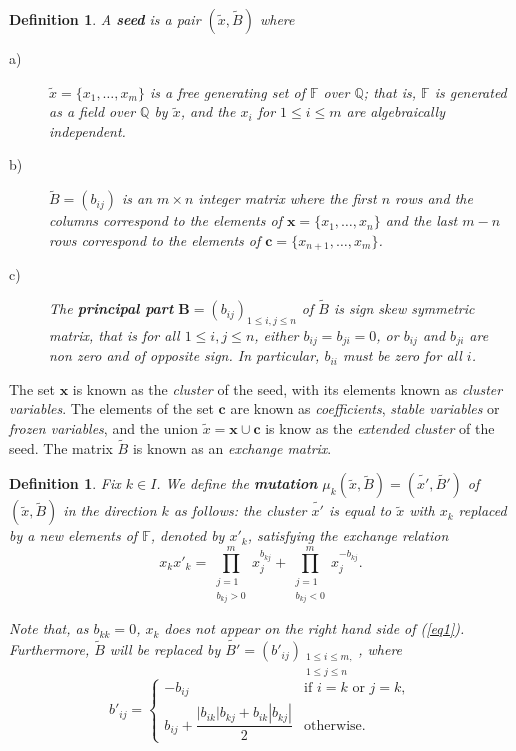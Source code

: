 \documentclass[12pt,a4paper]{article}
\newtheorem{definition}[Theorem]{Definition}
\begin{document}
\begin{definition}
A \textbf{seed} is a pair $(\tilde{x}, \tilde{B})$ where

\begin{description}
\item[a) ] $\tilde{x} = \lbrace x_1, \ldots, x_m \rbrace$ is a free generating set of $\mathbb{F}$ over $\mathbb{Q}$; that is, $\mathbb{F}$ is generated as a field over $\mathbb{Q}$ by $\tilde{x}$, and the $x_i$ for $1\leq i \leq m$ are algebraically independent.

\item[b) ] $\tilde{B}=(b_{ij})$ is an $m\times n$ integer matrix where the first $n$ rows and the columns correspond to the elements of $\mathbf{x}= \lbrace x_1,\ldots,x_n \rbrace$ and the last $m-n$ rows correspond to the elements of $\mathbf{c}=\lbrace x_{n+1}, \ldots, x_m \rbrace$.

\item[c) ] The \textbf{principal part} $\textbf{B}=(b_{ij})_{1\leq i,j \leq n}$ of $\tilde{B}$ is sign skew symmetric matrix, that is for all $1 \leq i,j \leq n$, either $b_{ij}=b_{ji} = 0$, or $b_{ij}$ and $b_{ji}$ are non zero and of opposite sign. In particular, $b_{ii}$ must be zero for all $i$.
\end{description}
\end{definition}

The set $\textbf{x}$ is known as the \textit{cluster} of the seed, with its elements known as \textit{cluster variables}. The elements of the set $\textbf{c}$ are known as \textit{coefficients}, \textit{stable variables} or \textit{frozen variables}, and the union $\tilde{x}=\textbf{x} \cup \textbf{c}$ is know as the \textit{extended cluster} of the seed. The matrix $\tilde{B}$ is known as an \textit{exchange matrix}.

\begin{definition}
Fix $k \in I$. We define the \textbf{mutation} $\mu_k(\tilde{x},\tilde{B})=(\tilde{x'},\tilde{B'})$ of $(\tilde{x},\tilde{B})$ in the direction $k$ as follows: the cluster $\tilde{x'}$ is equal to $\tilde{x}$ with $x_k$ replaced by a new elements of $\mathbb{F}$, denoted by $x'_k$, satisfying the exchange relation 
\begin{equation}
x_kx'_k = \prod^{m}_{\substack{j=1 \\ b_{kj}>0}}x_{j}^{b_{kj}}+ \prod^{m}_{\substack{j=1 \\ b_{kj}<0}}x_{j}^{-b_{kj}}.
\label{eq1}
\end{equation}

Note that, as $b_{kk}=0$, $x_k$ does not appear on the right hand side of (\ref{eq1}). Furthermore, $\tilde{B}$ will be replaced by $\tilde{B'}=(b'_{ij})_{\substack{1 \leq i \leq m,\\ 1 \leq j \leq n}}$, where
\begin{equation}
b'_{ij}=\left\{
\begin{array}{ll}
-b_{ij} & \text{if } i=k \text{ or } j=k,\\
b_{ij}+\dfrac{|b_{ik}|b_{kj} + b_{ik}|b_{kj}|}{2} & \text{otherwise}.
\end{array} \right.
\end{equation}
\label{def6}
\end{definition} 
\end{document}
